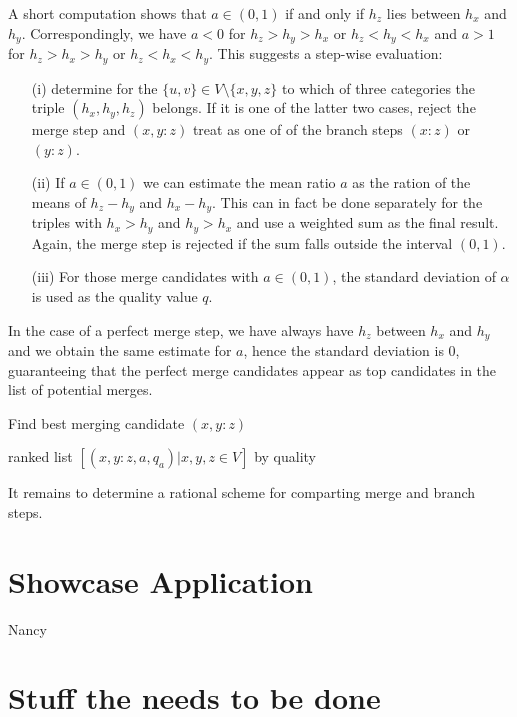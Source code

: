 \documentclass[amsmath]{lni}
\newcommand{\TODO}[1]{\begingroup\color{red}#1\endgroup}
\begin{document}
A short computation shows that $a\in(0,1)$ if and only if $h_z$ lies
between $h_x$ and $h_y$. Correspondingly, we have $a<0$ for $h_z>h_y>h_x$
or $h_z<h_y<h_x$ and $a>1$ for $h_z>h_x>h_y$ or $h_z<h_x<h_y$.  This
suggests a step-wise evaluation:
\begin{itemize} 
\item[(i)] determine for the $\{u,v\}\in V\setminus\{x,y,z\}$ to which of
  three categories the triple $(h_x,h_y,h_z)$ belongs. If it is one of the
  latter two cases, reject the merge step and $(x,y:z)$ treat as one of of
  the branch steps $(x:z)$ or $(y:z)$.
\item[(ii)] If $a\in(0,1)$ we can estimate the mean ratio $a$ as the ration
  of the means of $h_z-h_y$ and $h_x-h_y$. This can in fact be done
  separately for the triples with $h_x>h_y$ and $h_y>h_x$ and use a
  weighted sum as the final result. Again, the merge step is rejected if
  the sum falls outside the interval $(0,1)$. 
\item[(iii)] For those merge candidates with $a\in(0,1)$, the standard
  deviation of $\alpha$ is used as the quality value $q$.
\end{itemize}
In the case of a perfect merge step, we have always have $h_z$ between
$h_x$ and $h_y$ and we obtain the same estimate for $a$, hence the standard
deviation is $0$, guaranteeing that the perfect merge candidates appear as
top candidates in the list of potential merges.

\begin{algorithm}[H]
\caption{Find best merging candidate $(x,y:z)$ } 
\label{alg:mergestep}

\Return ranked list $[(x,y:z,a,q_a)| x,y,z\in V]$ by quality\;
\end{algorithm} 

It remains to determine a rational scheme for comparting merge and branch
steps.

\section{Showcase Application}

\TODO{Nancy}

\section{Stuff the needs to be done} 



   
\end{document}
